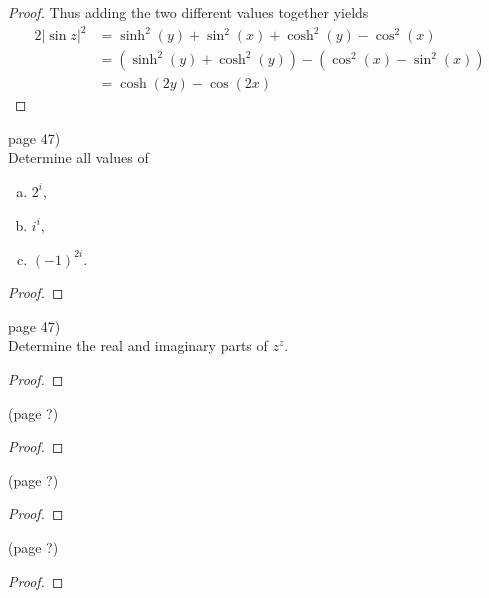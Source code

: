 \documentclass{article}
\newenvironment{problem}[2][Problem]{\begin{trivlist}
\item[\hskip \labelsep {\bfseries #1}\hskip \labelsep {\bfseries #2.}]}{\end{trivlist}}
\begin{document}
\begin{proof}
  Thus adding the two different values together yields \begin{align*}
    2|\sin z|^2 &= \sinh^2(y) + \sin^2(x) + \cosh^2(y) - \cos^2(x) \\
    &= (\sinh^2(y) + \cosh^2(y)) - (\cos^2(x) - \sin^2(x)) \\
    &= \cosh(2y) - \cos(2x)
  \end{align*}
\end{proof}
\pagebreak

\begin{problem}{6} (page 47) \\
  Determine all values of \begin{enumerate}[(a)]
    \item $2^i$,
    \item $i^i$,
    \item $(-1)^{2i}$.
  \end{enumerate}
\end{problem}

\begin{proof}
\end{proof}

\pagebreak

\begin{problem}{7} (page 47) \\
  Determine the real and imaginary parts of $z^z$.
\end{problem}

\begin{proof}
\end{proof}

\pagebreak

\begin{problem}{?} (page ?) \\
\end{problem}

\begin{proof}
\end{proof}

\pagebreak

\begin{problem}{?} (page ?) \\
\end{problem}

\begin{proof}
\end{proof}

\pagebreak

\begin{problem}{?} (page ?) \\
\end{problem}

\begin{proof}
\end{proof}
\end{document}

